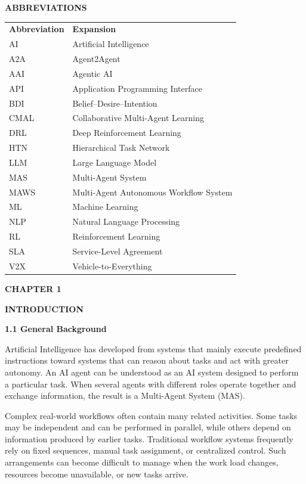 \documentclass[12pt,letterpaper]{article}
\newcommand{\chaptertitle}[2]{%
  \begin{center}
    {\fontsize{15pt}{18pt}\selectfont\bfseries #1\par}%
    \vspace{2pt}%
    {\fontsize{15pt}{18pt}\selectfont\bfseries #2\par}%
  \end{center}%
  \vspace{10pt}%
}
\newcommand{\frontmattertitle}[1]{%
  \begin{center}
    {\fontsize{13.2pt}{16pt}\selectfont\bfseries #1\par}%
  \end{center}%
  \vspace{10pt}%
}
\newcommand{\sectiontitle}[1]{%
  \vspace{6pt}%
  {\noindent\fontsize{13.2pt}{16pt}\selectfont\bfseries #1\par}%
  \vspace{2pt}%
}
\newcommand{\bodytextstyle}{\fontsize{11.3pt}{25.8pt}\selectfont}
\begin{document}
\frontmattertitle{ABBREVIATIONS}
\vspace{16pt}

\fontsize{11.3pt}{18.8pt}\selectfont
\noindent\begin{tabular}{@{}p{3.8cm}p{11.2cm}@{}}
\textbf{Abbreviation} & \textbf{Expansion} \\[4pt]
AI & Artificial Intelligence \\
A2A & Agent2Agent \\
AAI & Agentic AI \\
API & Application Programming Interface \\
BDI & Belief–Desire–Intention \\
CMAL & Collaborative Multi-Agent Learning \\
DRL & Deep Reinforcement Learning \\
HTN & Hierarchical Task Network \\
LLM & Large Language Model \\
MAS & Multi-Agent System \\
MAWS & Multi-Agent Autonomous Workflow System \\
ML & Machine Learning \\
NLP & Natural Language Processing \\
RL & Reinforcement Learning \\
SLA & Service-Level Agreement \\
V2X & Vehicle-to-Everything \\
\end{tabular}
\newpage

\setcounter{page}{1}
\bodytextstyle

\chaptertitle{CHAPTER 1}{INTRODUCTION}

\sectiontitle{1.1 General Background}
Artificial Intelligence has developed from systems that mainly execute predefined instructions toward systems that can reason about tasks and act with greater autonomy. An AI agent can be understood as an AI system designed to perform a particular task. When several agents with different roles operate together and exchange information, the result is a Multi-Agent System (MAS).

Complex real-world workflows often contain many related activities. Some tasks may be independent and can be performed in parallel, while others depend on information produced by earlier tasks. Traditional workflow systems frequently rely on fixed sequences, manual task assignment, or centralized control. Such arrangements can become difficult to manage when the work load changes, resources become unavailable, or new tasks arrive.
\end{document}
